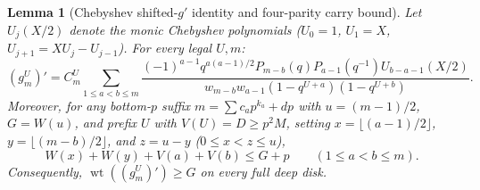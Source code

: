 \documentclass[11pt,reqno]{amsart}
\numberwithin{equation}{section}
\newtheorem{lemma}[theorem]{Lemma}
\theoremstyle{definition}
\theoremstyle{remark}
\newcommand{\wt}{\operatorname{wt}}
\begin{document}
\begin{lemma}[Chebyshev shifted-$g'$ identity and four-parity carry bound]
\label{lem:chebyshev-gprime}
Let $U_j(X/2)$ denote the monic Chebyshev polynomials ($U_0=1$, $U_1=X$, $U_{j+1}=XU_j-U_{j-1}$). For every legal $U,m$:
\begin{equation}
\label{eq:gprime-cheb}
(g_m^U)' = C_m^U \sum_{1\le a < b\le m} \frac{(-1)^{a-1} q^{a(a-1)/2} P_{m-b}(q) P_{a-1}(q^{-1}) U_{b-a-1}(X/2)}{w_{m-b} w_{a-1} (1-q^{U+a})(1-q^{U+b})}.
\end{equation}
Moreover, for any bottom-$p$ suffix $m = \sum c_a p^{k_a} + dp$ with $u=(m-1)/2$, $G=W(u)$, and prefix $U$ with $V(U)=D\ge p^2 M$, setting $x=\lfloor(a-1)/2\rfloor$, $y=\lfloor(m-b)/2\rfloor$, and $z=u-y$ ($0\le x<z\le u$),
\begin{equation}
\label{eq:four-parity}
W(x) + W(y) + V(a) + V(b) \le G + p \qquad (1\le a < b\le m).
\end{equation}
Consequently, $\wt((g_m^U)') \ge G$ on every full deep disk.
\end{lemma}
\end{document}
